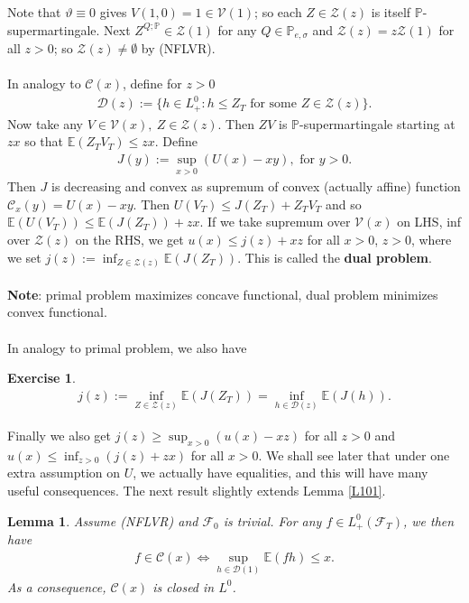 \documentclass[12pt,a4paper, twoside]{article}
\newtheorem{lem}{Lemma}[section]
\newtheorem{exe}{Exercise}[section]
\theoremstyle{definition}
\newcommand{\EE}{\mathbb{E}} %
\newcommand{\PP}{\mathbb{P}} %
\begin{document}
Note that $\vartheta \equiv 0$ gives $V(1,0)=1 \in \mathcal{V}(1)$; so each $Z \in \mathcal{Z}(z)$ is itself $\PP$-supermartingale. Next $Z^{Q; \PP} \in \mathcal{Z}(1)$ for any $Q \in \PP_{e, \sigma}$ and $\mathcal{Z}(z)=z \mathcal{Z}(1)$ for all $z >0$; so $\mathcal{Z}(z) \neq \emptyset$ by (NFLVR). 
\\\\
In analogy to $\mathcal{C}(x)$, define for $z>0$ 
\begin{align*}
\mathcal{D}(z):= \{ h \in L_+^0: h \leq Z_T \text{ for some } Z \in \mathcal{Z}(z) \}. 
\end{align*}
Now take any $V \in \mathcal{V}(x), \ Z \in \mathcal{Z}(z)$. Then $ZV$ is $\PP$-supermartingale starting at $zx$ so that $\EE(Z_TV_T) \leq zx$. Define 
\begin{align*}
J(y):= \sup_{x >0} (U(x)-xy), \text{ for } y>0. 
\end{align*}
Then $J$ is decreasing and convex as supremum of convex (actually affine) function $\mathcal{C}_x(y)=U(x)-xy$. Then $U(V_T) \leq J(Z_T) + Z_TV_T$ and so $\EE(U(V_T)) \leq \EE(J(Z_T)) + zx$. If we take supremum over $\mathcal{V}(x)$ on LHS, inf over $\mathcal{Z}(z)$ on the RHS, we get $u(x) \leq j(z) + xz$ for all $x>0$, $z>0$, where we set $j(z):= \inf_{Z \in \mathcal{Z}(z)} \EE(J(Z_T)).$ This is called the \textbf{dual problem}.
\\\\
\textbf{Note}: primal problem maximizes concave functional, dual problem minimizes convex functional.
\\\\
In analogy to primal problem, we also have
\begin{exe} 
\begin{align*}
j(z):= \inf_{Z \in \mathcal{Z}(z)} \EE(J(Z_T)) = \inf_{h \in \mathcal{D}(z)} \EE(J(h)).
\end{align*}
\end{exe}
\noindent Finally we also get $j(z) \geq \sup_{x >0} (u(x)-xz)$ for all $z>0$ and $u(x) \leq \inf_{z >0} (j(z)+zx)$ for all $x>0$. We shall see later that under one extra assumption on $U$, we actually have equalities, and this will have many useful consequences.
\newpage
The next result slightly extends Lemma \ref{L101}.
\begin{lem} \label{L102} Assume (NFLVR) and $\mathcal{F}_0$ is trivial. For any $f \in L_+^0( \mathcal{F}_T)$, we then have 
\begin{align*}
f \in \mathcal{C}(x) \iff \sup_{h \in \mathcal{D}(1)} \EE(fh) \leq x.
\end{align*}
As a consequence, $\mathcal{C}(x)$ is closed in $L^0$. 
\end{lem}
\end{document}
